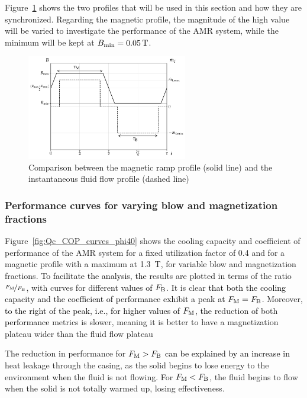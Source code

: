 \documentclass[referee]{svjour3}
\newcommand{\bmin}{\ensuremath{{B}\ped{min}}}
\begin{document}
 Figure~\ref{fig:ramp-inst} shows the two profiles that will be used in this section and how they are synchronized. Regarding the magnetic profile, the \textcolor{black}{magnitude of the} high value will be varied to investigate the performance of the AMR system, while the minimum will be kept at $\bmin = \SI{0.05}{\tesla}$. 

\begin{figure}[!ht]
  \centering
  \includegraphics[width=7cm]{profiles_rm_and_flow_instantaneous}
  \caption{Comparison between the magnetic \textcolor{black}{ramp} profile (solid line) and the instantaneous fluid flow profile (dashed line)}
  \label{fig:ramp-inst}
\end{figure}
 
\subsubsection{Performance curves for varying blow and magnetization fractions}
\label{sec:perf-curv-vary}

Figure~\ref{fig:Qc_COP_curves_phi40} shows the cooling capacity and coefficient of performance of the AMR system for a fixed utilization factor of \num{0.4} and for a magnetic profile with \textcolor{black}{a} maximum at \SI{1.3}{\tesla}, for \textcolor{black}{variable} blow and magnetization fractions. \textcolor{black}{To facilitate the analysis, the} results are plotted in terms of the ratio $\nicefrac{F_{\mathrm{M}}}{F_{\mathrm{B}}}$, with curves for different \textcolor{black}{values of} $F_{\mathrm{B}}$. It is clear \textcolor{black}{that both the cooling capacity and the coefficient of performance exhibit a peak at} $F_{\mathrm{M}} = F_{\mathrm{B}}$. Moreover,  \textcolor{black}{to the right of the peak, i.e., for higher values of $F_{\mathrm{M}}$, the}  reduction \textcolor{black}{of} both \textcolor{black}{performance} metrics \textcolor{black}{is} slower, meaning it is better to have a magnetization plateau wider than the fluid flow plateau 

The reduction in performance for $F_{\mathrm{M}} > F_{\mathrm{B}}$ \textcolor{black}{can be explained by an increase in} heat leakage through the casing, as the solid begins to lose energy to the environment \textcolor{black}{when} the fluid is not flowing. For $F_{\mathrm{M}} < F_{\mathrm{B}}$,  the fluid begins to flow when the solid is not totally warmed up, losing effectiveness.
\end{document}
